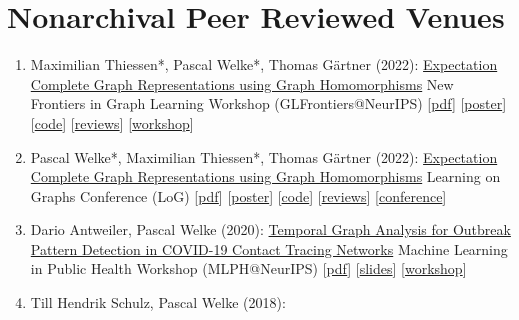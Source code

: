 \documentclass{scrartcl}
\begin{document}
\section{Nonarchival Peer Reviewed Venues}
\begin{enumerate}
\conti
\item
\label{thiessen2022expectation}
Maximilian Thiessen*, Pascal Welke*, Thomas Gärtner (2022):\newline
\href{https://pwelke.github.io/}{Expectation Complete Graph Representations using Graph Homomorphisms}\newline
New Frontiers in Graph Learning Workshop (GLFrontiers@NeurIPS)\newline
{\footnotesize
[\href{https://pwelke.github.io/publications/thiessen2022glfrontiers.pdf}{pdf}]
[\href{https://pwelke.github.io/publications/expectation_complete_poster_neurips.pdf}{poster}]
[\href{https://github.com/pwelke/homcount}{code}]
[\href{https://openreview.net/forum?id=Zf-Mn6xzD2B}{reviews}]
[\href{https://glfrontiers.github.io/}{workshop}]
}
\item
\label{welke2022expectation}
Pascal Welke*, Maximilian Thiessen*, Thomas Gärtner (2022):\newline
\href{https://pwelke.github.io/}{Expectation Complete Graph Representations using Graph Homomorphisms}\newline
Learning on Graphs Conference (LoG)\newline
{\footnotesize
[\href{https://pwelke.github.io/publications/welke2022log.pdf}{pdf}]
[\href{https://pwelke.github.io/publications/expectation_complete_poster_neurips.pdf}{poster}]
[\href{https://github.com/pwelke/homcount}{code}]
[\href{https://openreview.net/forum?id=8GJyW4i2oST}{reviews}]
[\href{http://log2022.logconference.org/}{conference}]
}
\item
\label{antweiler2020temporal}
Dario Antweiler, Pascal Welke (2020):\newline
\href{https://pwelke.github.io/}{Temporal Graph Analysis for Outbreak Pattern Detection in COVID-19 Contact Tracing Networks}\newline
Machine Learning in Public Health Workshop (MLPH@NeurIPS)\newline
{\footnotesize
[\href{https://pwelke.github.io/publications/antweiler2020temporal.pdf}{pdf}]
[\href{https://pwelke.github.io/publications/antweiler2020temporal-slides.pdf}{slides}]
[\href{https://sites.google.com/nyu.edu/mlph2020/}{workshop}]
}
\item
\label{schulz2018necessity}
Till Hendrik Schulz, Pascal Welke (2018):\newline

\end{enumerate}
\end{document}
